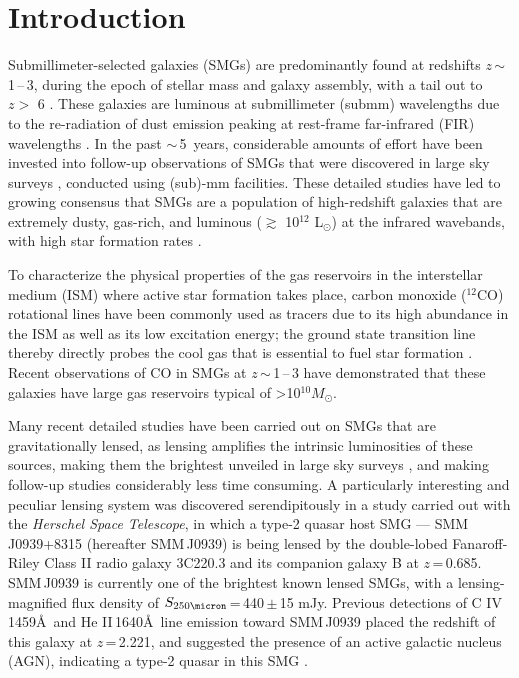 \documentclass[twocolumn,apj,numberedappendix]{emulateapj}
\newcommand{\Msun}{\mbox{$M_{\odot}$}}
\newcommand{\Lsun}{\mbox{L$_{\odot}$}}
\newcommand{\eg}{{\sl e.g.,~}}
\newcommand{\pmOne}{\mbox{$^{-1}$}}
\begin{document}
\section{Introduction}\label{sec:intro}
Submillimeter-selected galaxies (SMGs) are predominantly found at redshifts $z$\,$\sim$\,1\,--\,3, during the epoch of stellar mass and
galaxy assembly, with a tail out to $z>$ 6 \citep{Riechers13a}.
These galaxies are luminous at submillimeter (submm) wavelengths due to the re-radiation of dust emission peaking at
rest-frame far-infrared (FIR) wavelengths \citep{blain02a}.
In the past $\sim$\,5~years, considerable amounts of effort have been invested into follow-up observations of SMGs that were
discovered in large sky surveys \citep[\eg H-ATLAS, HerMES, SPT; ][]{Eales10a,Oliver12a,Vieira10a}, conducted using (sub)-mm facilities. These detailed studies have led to growing consensus that SMGs are a population of high-redshift galaxies that are extremely dusty, gas-rich,
  and luminous ($\gtrsim$ 10$^{12}$ \Lsun) at the infrared wavebands, with high star formation rates \citep[$\gtrsim $ 500 \Msun yr\pmOne; \eg][]{Lagache05a,Casey14a}.

  To characterize the physical properties of the gas reservoirs in the interstellar medium (ISM) where active star formation takes place, carbon monoxide ($^{12}$CO) rotational lines have been commonly used as tracers due to its high abundance in the ISM as well as its low excitation energy; the ground state transition line thereby directly probes the cool gas that is essential to fuel star formation \citep[See \eg][]{Solomon05a,Carilli13a}. Recent observations of CO in SMGs at $z$\,$\sim$\,1\,--\,3 have demonstrated that these galaxies have large gas reservoirs typical of \textgreater 10$^{10}$\Msun \citep[\eg][]{Riechers11c,Riechers11d,Ivison11a,Bothwell13a}.

Many recent detailed studies have been carried out on SMGs that are gravitationally lensed,
 as lensing amplifies the intrinsic luminosities of these sources, making them the brightest unveiled in large sky surveys \citep{Negrello10a,Vieira10a,Oliver12a}, and making follow-up studies considerably less time consuming.
A particularly interesting and peculiar lensing system was discovered serendipitously in a study carried out with the {\it Herschel Space Telescope}, in which
a type-2 quasar host SMG --- SMM\,J0939+8315 (hereafter SMM\,J0939) is being lensed by the double-lobed Fanaroff-Riley
Class II \citep*[FR-II; ][]{Fanaroff74} radio galaxy 3C220.3 and its
companion galaxy B at $z$\,=\,0.685.
SMM\,J0939 is currently one of the brightest known lensed
SMGs, with a lensing-magnified flux density of $S_\textrm{250\micron}$\,=\,440\,$\pm$\,15 mJy.
Previous detections of C {\scriptsize\sc IV}\,1459\AA\
 and He {\scriptsize\sc II}\,1640\AA\ line emission toward SMM\,J0939
 placed the redshift of this galaxy at $z$\,=\,2.221, and suggested the presence of an active galactic nucleus (AGN),
indicating a type-2 quasar in this SMG \citep[hereafter H14]{Haas14}.
\end{document}
